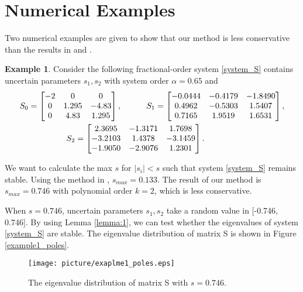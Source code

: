 \documentclass[]{interact}
\theoremstyle{plain}%
\theoremstyle{definition}
\newtheorem{example}[theorem]{Example}
\theoremstyle{remark}
\begin{document}
\section{Numerical Examples}                                                                             
Two numerical examples are given to show that our method is less conservative than the results in \cite{Chen2015} and \cite{Far2011}.
\begin{example}
	Consider the following fractional-order system \eqref{system_S} contains uncertain parameters $s_1,s_2$ with system order $\alpha=0.65$ and
	\begin{equation} \label{example1_def}
	\begin{split}
	&S_0 = \begin{bmatrix}-2 & 0 & 0\\0  & 1.295 & -4.83\\ 0  & 4.83  & 1.295	\end{bmatrix}, \indent \indent  
	S_1 = \begin{bmatrix}-0.0444 &  -0.4179 &  -1.8490\\ 0.4962 &  -0.5303  &  1.5407\\ 0.7165  &  1.9519 &   1.6531 \end{bmatrix},   \\
	&\hspace{2cm}S_2 = \begin{bmatrix}  2.3695 &  -1.3171  &  1.7698 \\ -3.2103 &   1.4378  & -3.1459 \\ -1.9050 &  -2.9076  & 1.2301\end{bmatrix}. 
	\end{split}
	\end{equation}
	\par We want to calculate the max $s$ for $|s_i| < s$ such that system \eqref{system_S} remains stable. Using the method in \cite{Chen2015}, $s_{max} = 0.133$. The result of our method is $s_{max} = 0.746$ with polynomial order $k=2$, which is less conservative.
	\par When $s=0.746$, uncertain parameters $s_1, s_2$ take a random value in [-0.746, 0.746]. By using Lemma \ref{lemma:1}, we can test whether the eigenvalues of system \eqref{system_S} are stable. The eigenvalue distribution of matrix S is shown in Figure \ref{example1_poles}. 
	\begin{figure}[H]
		\centering
	    \texttt{[image: picture/exaplme1\_poles.eps]}
		\caption{The eigenvalue distribution of matrix S with $s=0.746$.} 

\end{figure}
\end{example}
\end{document}
